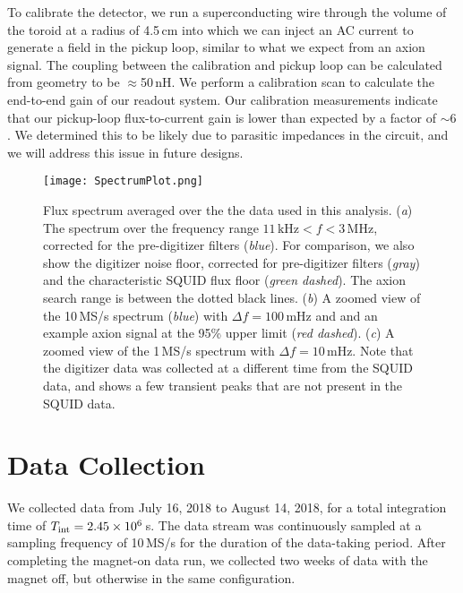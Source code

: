 \documentclass[aps,prl,amsmath,amssymb,reprint,superscriptaddress, nofootinbib,
]{revtex4-1}
\begin{document}
To calibrate the detector, we run a superconducting wire through the volume of the toroid at a radius of 4.5\,cm into which we can inject an AC current to generate a field in the pickup loop, similar to what we expect from an axion signal. The coupling between the calibration and pickup loop can be calculated from geometry to be $\approx$50\,nH. We perform a calibration scan to calculate the end-to-end gain of our readout system. Our calibration measurements indicate that our pickup-loop flux-to-current gain is lower than expected by a factor of $\sim6$. We determined this to be likely due to parasitic impedances in the circuit, and we will address this issue in future designs.


 
\begin{figure*}
  \centering
  \texttt{[image: SpectrumPlot.png]}
  \caption{Flux spectrum averaged over the the data used in this analysis. (\emph{a}) The spectrum over the frequency range \mbox{$11\,\mathrm{kHz}<f<3\,\mathrm{MHz}$}, corrected for the pre-digitizer filters (\emph{blue}). For comparison, we also show the digitizer noise floor, corrected for pre-digitizer filters (\emph{gray}) and the characteristic SQUID flux floor (\emph{green dashed}). The axion search range is between the dotted black lines. (\emph{b}) A zoomed view of the 10\,MS/s spectrum (\emph{blue}) with $\Delta f = 100$\,mHz and and an example axion signal at the 95\% upper limit (\emph{red dashed}). (\emph{c}) A zoomed view of the 1\,MS/s spectrum with $\Delta f=10$\,mHz. Note that the digitizer data was collected at a different time from the SQUID data, and shows a few transient peaks that are not present in the SQUID data.
 }
    \label{fig:spectrum}
\end{figure*}


\section{Data Collection}
We collected data from July 16, 2018 to August 14, 2018, for a total integration time of $T_{\rm int}=2.45\times10^{6}$\,s. The data stream was continuously sampled at a sampling frequency of 10\,MS/s for the duration of the data-taking period. After completing the magnet-on data run, we collected two weeks of data with the magnet off, but otherwise in the same configuration.
\end{document}
